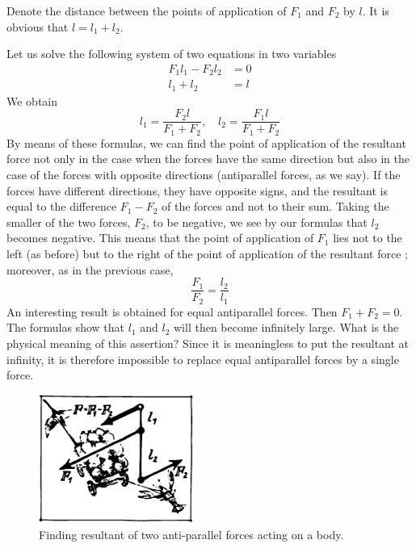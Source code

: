 Denote the distance between the points of application
of $F_{1}$ and $F_{2}$ by $l$. It is obvious that $l = l_{1} + l_{2}$.

Let us solve the following system of two equations in two variables
 \begin{align*}%
F_{1} l_{1} - F_{2} l_{2}  & = 0 \\
l_{1} + l_{2} & = l
 \end{align*}
We obtain
\begin{equation*}%
l_{1} = \dfrac{F_{2} l}{F_{1} + F_{2}}, \quad  l_{2} = \dfrac{F_{1}l}{F_{1} + F_{2}}
 \end{equation*}
By means of these formulas, we can find the point of
application of the resultant force not only in the case
when the forces have the same direction but also in the
case of the forces with opposite directions (antiparallel
forces, as we say). If the forces have different directions,
they have opposite signs, and the resultant is equal to the
difference $F_{1} - F_{2}$ of the forces and not to their sum.
Taking the smaller of the two forces, $F_{2}$, to be negative,
we see by our formulas that $l_{2}$ becomes negative. This
means that the point of application of $F_{1}$ lies not to the
left (as before) but to the right of the point of application
of the resultant force ; moreover, as in the
previous case,
 \begin{equation*}%
\dfrac{F_{1}}{F_{2}} = \dfrac{l_{2}}{l_{1}}
 \end{equation*}
An interesting result is obtained for equal antiparallel forces. Then $F_{1} + F_{2} = 0$. The formulas show that $l_{1}$
and $l_{2}$ will then become infinitely large. What is the physical meaning of this assertion? Since it is meaningless to put the resultant at infinity, it is therefore impossible to replace equal antiparallel forces by a single force.

 \begin{figure}[!ht]
 \centering
 \includegraphics[width=0.45\textwidth]{figures/fig-5-07.pdf}
 \caption{Finding resultant of two anti-parallel forces acting on a body.}
 \label{fig-5-07}
 \end{figure}


